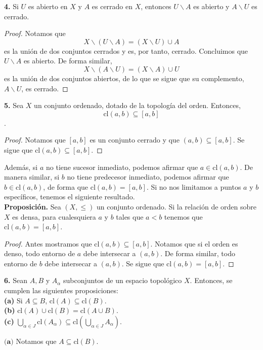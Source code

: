 \documentclass{article}
\begin{document}
\begin{mybox}
\textbf{4. } 	Si $U$ es abierto en $X$ y $A$ es cerrado en $X$, entonces $U \backslash A$ es abierto y $A \backslash U$ es cerrado.
\end{mybox}
\begin{proof}
	Notamos que 
	$$ X \backslash ( U \backslash  A) = (X \backslash U) \cup A $$
	es la unión de dos conjuntos cerrados y es, por tanto, cerrado. Concluimos que $U\backslash A$ es abierto.  De forma similar,
	$$X \backslash ( A \backslash  U) = (X \backslash A) \cup U $$
	es la unión de dos conjuntos abiertos, de lo que se sigue que su complemento, $A \backslash U$, es cerrado. 
\end{proof}	

\begin{mybox}
	\textbf{5. } Sea $X$ un conjunto ordenado, dotado de la topología del orden. Entonces, 
	$$ \text{cl}(a, b) \subseteq [a, b ] $$. 
\end{mybox}	
\begin{proof}
	Notamos que $[a, b]$ es un conjunto cerrado y que $(a, b) \subseteq [a, b]$. Se sigue que $\text{cl}(a, b) \subseteq [a, b]$.
\end{proof}

Además, si $a$ no tiene sucesor inmediato, podemos afirmar que $a \in \text{cl}(a, b)$. De manera similar, si $b$ no tiene predecesor inmediato, podemos afirmar que $b \in \text{cl}(a, b)$, de forma que $\text{cl}(a, b) = [a, b]$. Si no nos limitamos a puntos $a$ y $b$ específicos, tenemos el siguiente resultado. \\

\textbf{Proposición. } Sea $(X, \leq )$ un conjunto ordenado. Si la relación de orden sobre $X$ es densa, para cualesquiera $a$ y $b$ tales que $a < b$ tenemos que $\text{cl}(a, b) = [a, b]$.
\begin{proof}
	Antes mostramos que $\text{cl}(a, b) \subseteq [a, b]$. Notamos que si el orden es denso, todo entorno de $a$ debe intersecar a $(a, b)$. De forma similar, todo entorno de $b$ debe intersecar a $(a, b)$. Se sigue que $\text{cl}(a, b) = [a, b]$.
\end{proof}

\begin{mybox}
	\textbf{6.} Sean $A, B$ y $A_{\alpha}$ subconjuntos de un espacio topológico $X$. Entonces, se cumplen las siguientes proposiciones: \\
	
	\textbf{(a)} Si $A\subseteq B$, $\text{cl}(A) \subseteq \text{cl}(B)$.  \\
	
    \textbf{(b)} $\text{cl}(A) \cup \text{cl}(B) = \text{cl}(A \cup B) .$ \\
    
    \textbf{(c)} $\bigcup_{\alpha \in J} \text{cl}(A_{\alpha}) \subseteq  \text{cl}\left( \bigcup_{\alpha \in J} A_{\alpha} \right)$.  
	
\end{mybox}	
$\textbf{(a)}$ Notamos que $A \subseteq \text{cl}(B)$.
\end{document}
